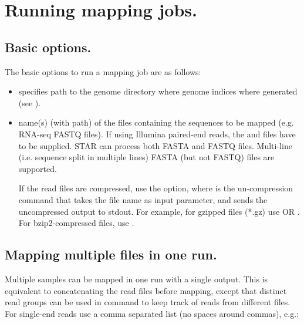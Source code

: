 \documentclass[12pt]{article}
\begin{document}
\section{Running mapping jobs.}\label{Running_mapping_jobs}
\subsection{Basic options.}
The basic options to run a mapping job are as follows:

\begin{itemize}
\item[]

 specifies path to the genome directory where genome indices where generated (see ).

\item[]
 name(s) (with path) of the files containing the sequences to be mapped (e.g. RNA-seq FASTQ files). If using Illumina paired-end reads, the  and  files have to be supplied. STAR can process both FASTA and FASTQ files. Multi-line (i.e. sequence split in multiple lines) FASTA (but not FASTQ) files are supported. 

If the read files are compressed, use the   option, where  is the un-compression command that takes the file name as input parameter, and sends the uncompressed output to stdout. For example, for gzipped files (*.gz) use
OR
.
For bzip2-compressed files, use
.

\end{itemize}

\subsection{Mapping multiple files in one run.}
Multiple samples can be mapped in one run with a single output. This is equivalent to concatenating the read files before mapping, except that distinct read groups can be used in  command to keep track of reads from different files. For single-end reads use a comma separated list (no spaces around commas), e.g.:
\end{document}
